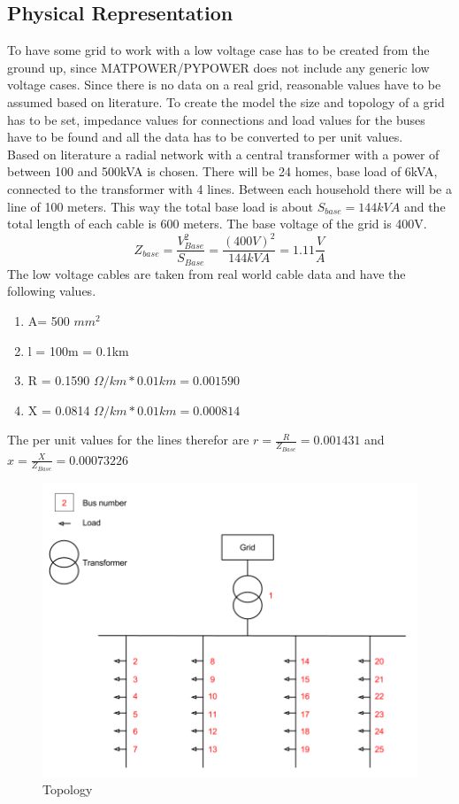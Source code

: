 \documentclass[a4paper]{article}
\begin{document}
\subsection{Physical Representation}
To have some grid to work with a low voltage case has to be created from the ground up, since MATPOWER/PYPOWER does not include any generic low voltage cases. Since there is no data on a real grid, reasonable values have to be assumed based on literature. To create the model the size and topology of a grid has to be set, impedance values for connections and load values for the buses have to be found and all the data has to be converted to per unit values. \\ 
Based on literature\cite{powerbook} a radial network with a central transformer with a power of between 100 and 500kVA is chosen. There will be 24 homes, base load of 6kVA, connected to the transformer with 4 lines. Between each household there will be a line of 100 meters. This way the total base load is about $S_{base}=144kVA$ and the total length of each cable is 600 meters. The base voltage of the grid is 400V. \\
\begin{equation}
Z_{base}=\frac{V_{Base}^2}{S_{Base}}=\frac{(400V)^2}{144kVA} = 1.11\frac{V}{A}
\end{equation}
The low voltage cables are taken from real world cable data and have the following values\cite{cabletable}. 
\begin{enumerate}
\item A= 500 $mm^2$
\item l = 100m = 0.1km
\item R = 0.1590 $\Omega/km * 0.01km = 0.001590$
\item X = 0.0814 $\Omega/km * 0.01km =  0.000814$
\end{enumerate}
The per unit values for the lines therefor are $r = \frac{R}{Z_{Base}}=0.001431$
and $x=\frac{X}{Z_{Base}}=0.00073226$
\begin{figure}[!ht]
\centering
\includegraphics[width = \textwidth]{Topology.png}
\caption{Topology}
\label{topology}
\end{figure}
\end{document}
